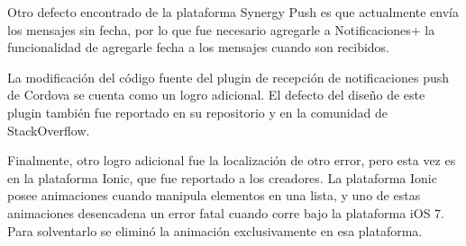 Otro defecto encontrado de la plataforma Synergy Push es que actualmente envía los mensajes sin fecha, por lo que fue necesario agregarle a Notificaciones+ la funcionalidad de agregarle fecha a los mensajes cuando son recibidos.

La modificación del código fuente del plugin de recepción de notificaciones push de Cordova se cuenta como un logro adicional. El defecto del diseño de este plugin también fue reportado en su repositorio y en la comunidad de StackOverflow.

Finalmente, otro logro adicional fue la localización de otro error, pero esta vez es en la plataforma Ionic, que fue reportado a los creadores. La plataforma Ionic posee animaciones cuando manipula elementos en una lista, y uno de estas animaciones desencadena un error fatal cuando corre bajo la plataforma iOS 7. Para solventarlo se eliminó la animación exclusivamente en esa plataforma.
